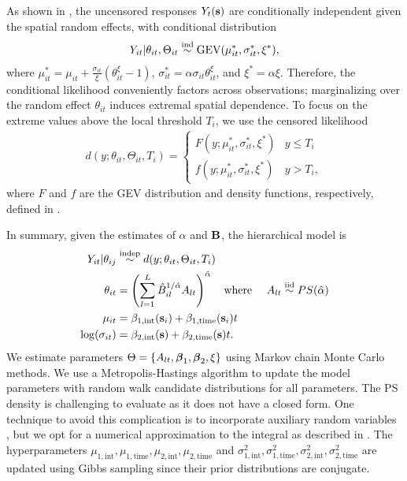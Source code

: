 As shown in \citet{Reich2012}, the uncensored responses $Y_{t}(\mathbf{s})$ are conditionally independent given the spatial random effects, with conditional distribution
\begin{align} \label{ebeq:Ycond}
   Y_{it}|\theta_{it},\Theta_{it} \stackrel{\mathrm{ind}}{\sim} \mathrm{GEV}(\mu^*_{it}, \sigma_{it}^*,\xi^*),
\end{align}
where $\mu_{it}^* = \mu_{it} + \frac{\sigma_{it}}{\xi}(\theta_{it}^\xi - 1)$,
$\sigma_{it}^* = \alpha\sigma_{it}\theta_{it}^\xi$, and $\xi^* = \alpha\xi$.
Therefore, the conditional likelihood conveniently factors across observations; marginalizing over the random effect $\theta_{it}$ induces extremal spatial dependence.
To focus on the extreme values above the local threshold $T_i$, we use the censored likelihood
\begin{align} \label{ebeq:g}
d(y;\theta_{it},\Theta_{it}, T_i)  =
\left\{\begin{array}{ll}
  F(y;\mu_{it}^*,\sigma_{it}^*,\xi^*) & y \le T_i \\
  f(y;\mu_{it}^*,\sigma_{it}^*,\xi^*) & y>T_i,
\end{array}\right.
\end{align}
where $F$ and $f$ are the GEV distribution and density functions, respectively, defined in .

In summary, given the estimates of $\alpha$ and $\mathbf{B}$, the hierarchical model is
\begin{align} \label{ebeq:bayesmodel}
  Y_{it} |\theta_{ij} &\stackrel{\text{indep}}{\sim} d(y;\theta_{it},\Theta_{it}, T_i) \\
  \theta_{it} &= \left(\sum_{l=1}^L{\hat B}_{il}^{1/\hat{\alpha}}A_{lt}\right)^{\hat{\alpha}}
  \text{\ \ \ where \ \ \ }
  A_{lt} \stackrel{\mathrm{iid}}{\sim} PS(\hat{\alpha})\nonumber\\
  \mu_{it} &= \beta_{1, \text{int}}(\mathbf{s}_i) + \beta_{1, \text{time}}(\mathbf{s}_i) t \nonumber \\
  \log(\sigma_{it}) &= \beta_{2, \text{int}}(\mathbf{s}) + \beta_{2, \text{time}}(\mathbf{s}) t. \nonumber
\end{align}
We estimate parameters $\Theta = \left\{A_{lt}, \mbox{\boldmath $\beta$}_1, \mbox{\boldmath $\beta$}_2, \xi \right\}$ using Markov chain Monte Carlo methods.
We use a Metropolis-Hastings algorithm to update the model parameters with random walk candidate distributions for all parameters.
The PS density is challenging to evaluate as it does not have a closed form.
One technique to avoid this complication is to incorporate auxiliary random variables \citep{Stephenson2009}, but we opt for a numerical approximation to the integral as described in .
The hyperparameters $\mu_{1, \text{int}}, \mu_{1, \text{time}}, \mu_{2, \text{int}}, \mu_{2, \text{time}}$ and $\sigma^2_{1, \text{int}}, \sigma^2_{1, \text{time}}, \sigma^2_{2, \text{int}}, \sigma^2_{2, \text{time}}$ are updated using Gibbs sampling since their prior distributions are conjugate.

